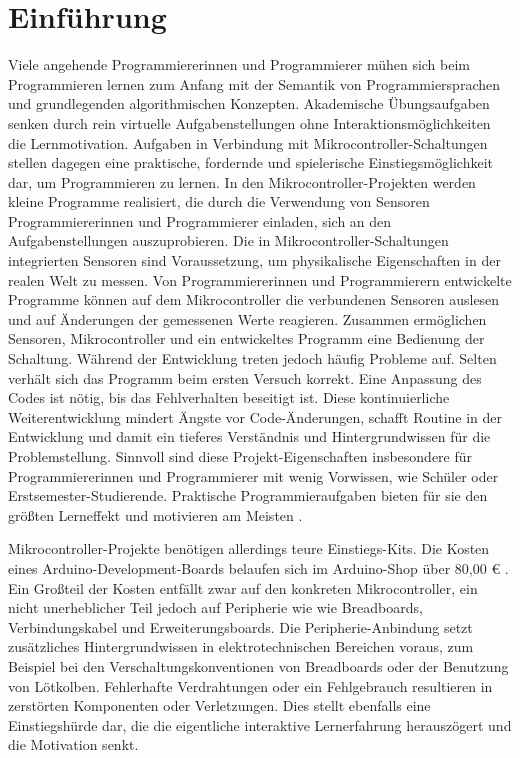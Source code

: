 \documentclass[11pt,a4paper]{report}
\begin{document}
\chapter{Einführung} \label{chap:intro}
Viele angehende Programmiererinnen und Programmierer mühen sich beim Programmieren lernen zum Anfang mit der Semantik von Programmiersprachen und grundlegenden algorithmischen Konzepten.
Akademische Übungsaufgaben senken durch rein virtuelle Aufgabenstellungen ohne Interaktionsmöglichkeiten die Lernmotivation.
Aufgaben in Verbindung mit Mikrocontroller-Schaltungen stellen dagegen eine praktische, fordernde und spielerische Einstiegsmöglichkeit dar, um Programmieren zu lernen.
In den Mikrocontroller-Projekten werden kleine Programme realisiert, die durch die Verwendung von Sensoren Programmiererinnen und Programmierer einladen, sich an den Aufgabenstellungen auszuprobieren.
Die in Mikrocontroller-Schaltungen integrierten Sensoren sind Voraussetzung, um physikalische Eigenschaften in der realen Welt zu messen.
Von Programmiererinnen und Programmierern entwickelte Programme können auf dem Mikrocontroller die verbundenen Sensoren auslesen und auf Änderungen der gemessenen Werte reagieren.
Zusammen ermöglichen Sensoren, Mikrocontroller und ein entwickeltes Programm eine Bedienung der Schaltung.
Während der Entwicklung treten jedoch häufig Probleme auf.
Selten verhält sich das Programm beim ersten Versuch korrekt.
Eine Anpassung des Codes ist nötig, bis das Fehlverhalten beseitigt ist.
Diese kontinuierliche Weiterentwicklung mindert Ängste vor Code-Änderungen, schafft Routine in der Entwicklung und damit ein tieferes Verständnis und Hintergrundwissen für die Problemstellung.
Sinnvoll sind diese Projekt-Eigenschaften insbesondere für Programmiererinnen und Programmierer mit wenig Vorwissen, wie Schüler oder Erstsemester-Studierende.
Praktische Programmieraufgaben bieten für sie den größten Lerneffekt und motivieren am Meisten \cite{learning_computer_programming}.

Mikrocontroller-Projekte benötigen allerdings teure Einstiegs-Kits.
Die Kosten eines Arduino-Development-Boards belaufen sich im Arduino-Shop über 80,00 € \cite{arduino_kit}.
Ein Großteil der Kosten entfällt zwar auf den konkreten Mikrocontroller, ein nicht unerheblicher Teil jedoch auf Peripherie wie wie Breadboards, Verbindungskabel und Erweiterungsboards.
Die Peripherie-Anbindung setzt zusätzliches Hintergrundwissen in elektrotechnischen Bereichen voraus, zum  Beispiel bei den Verschaltungskonventionen von Breadboards oder der Benutzung von Lötkolben.
Fehlerhafte Verdrahtungen oder ein Fehlgebrauch resultieren in zerstörten Komponenten oder Verletzungen.
Dies stellt ebenfalls eine Einstiegshürde dar, die die eigentliche interaktive Lernerfahrung herauszögert und die Motivation senkt.
\end{document}
